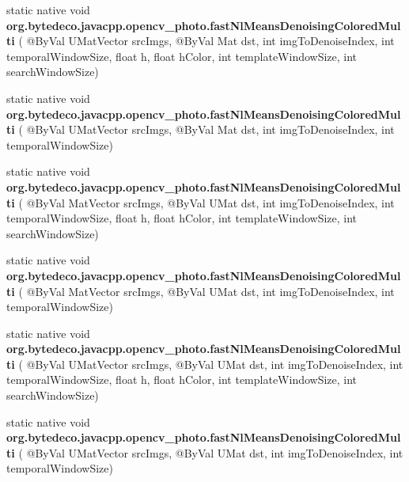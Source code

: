 \begin{DoxyCompactItemize}
static native void {\bfseries org.\+bytedeco.\+javacpp.\+opencv\+\_\+photo.\+fast\+Nl\+Means\+Denoising\+Colored\+Multi} ( @By\+Val U\+Mat\+Vector src\+Imgs, @By\+Val Mat dst, int img\+To\+Denoise\+Index, int temporal\+Window\+Size, float h, float h\+Color, int template\+Window\+Size, int search\+Window\+Size)
\item 
\mbox{\label{group__photo__denoise_ga91fb09c2f2ba0bb4342f185149b13c94}} 
static native void {\bfseries org.\+bytedeco.\+javacpp.\+opencv\+\_\+photo.\+fast\+Nl\+Means\+Denoising\+Colored\+Multi} ( @By\+Val U\+Mat\+Vector src\+Imgs, @By\+Val Mat dst, int img\+To\+Denoise\+Index, int temporal\+Window\+Size)
\item 
\mbox{\label{group__photo__denoise_gaea864c7aa3fd7158eca8b968f330edd8}} 
static native void {\bfseries org.\+bytedeco.\+javacpp.\+opencv\+\_\+photo.\+fast\+Nl\+Means\+Denoising\+Colored\+Multi} ( @By\+Val Mat\+Vector src\+Imgs, @By\+Val U\+Mat dst, int img\+To\+Denoise\+Index, int temporal\+Window\+Size, float h, float h\+Color, int template\+Window\+Size, int search\+Window\+Size)
\item 
\mbox{\label{group__photo__denoise_ga028fc4f37fa2fb9ce5035ee1b02359c9}} 
static native void {\bfseries org.\+bytedeco.\+javacpp.\+opencv\+\_\+photo.\+fast\+Nl\+Means\+Denoising\+Colored\+Multi} ( @By\+Val Mat\+Vector src\+Imgs, @By\+Val U\+Mat dst, int img\+To\+Denoise\+Index, int temporal\+Window\+Size)
\item 
\mbox{\label{group__photo__denoise_ga1e8f4b7d46c481fc3d925d3c09c8eae7}} 
static native void {\bfseries org.\+bytedeco.\+javacpp.\+opencv\+\_\+photo.\+fast\+Nl\+Means\+Denoising\+Colored\+Multi} ( @By\+Val U\+Mat\+Vector src\+Imgs, @By\+Val U\+Mat dst, int img\+To\+Denoise\+Index, int temporal\+Window\+Size, float h, float h\+Color, int template\+Window\+Size, int search\+Window\+Size)
\item 
\mbox{\label{group__photo__denoise_gab8ee08db77b996fec32424bc2baac5b2}} 
static native void {\bfseries org.\+bytedeco.\+javacpp.\+opencv\+\_\+photo.\+fast\+Nl\+Means\+Denoising\+Colored\+Multi} ( @By\+Val U\+Mat\+Vector src\+Imgs, @By\+Val U\+Mat dst, int img\+To\+Denoise\+Index, int temporal\+Window\+Size)
\item 

\end{DoxyCompactItemize}
